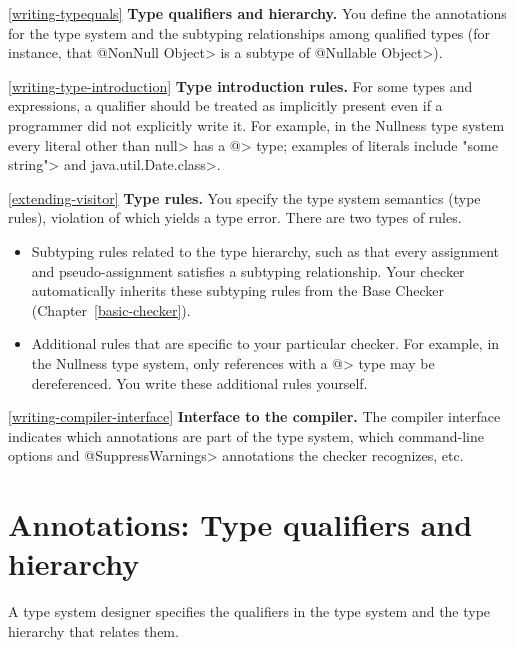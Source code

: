 \begin{description}

\item{\ref{writing-typequals}}
  \textbf{Type qualifiers and hierarchy.}  You define the annotations for
  the type system and the subtyping relationships among qualified types
  (for instance, that \<@NonNull Object> is a subtype of \<@Nullable
  Object>).

\item{\ref{writing-type-introduction}}
  \textbf{Type introduction rules.}  For some types and
  expressions, a qualifier should be treated as implicitly present even if a
  programmer did not explicitly write it.  For example, in the Nullness
  type system every literal
  other than \<null> has a \<@> type;
  examples of literals include \<"some string"> and \<java.util.Date.class>.

\item{\ref{extending-visitor}}
  \textbf{Type rules.}  You specify the type system semantics (type
  rules), violation of which yields a type error.  There are two types of
  rules.
\begin{itemize}
\item
  Subtyping rules related to the type hierarchy, such as that every
  assignment and pseudo-assignment satisfies a subtyping relationship.
  Your checker automatically inherits these subtyping rules from the Base
  Checker (Chapter~\ref{basic-checker}).
\item
  Additional rules that are specific to your particular checker.  For
  example, in the Nullness type system, only references with a
  \<@> type may be dereferenced.  You
  write these additional rules yourself.
\end{itemize}

\item{\ref{writing-compiler-interface}}
  \textbf{Interface to the compiler.}  The compiler interface indicates
  which annotations are part of the type system, which command-line options
  and \<@SuppressWarnings> annotations the checker recognizes, etc.
\end{description}


\section{Annotations: Type qualifiers and hierarchy\label{writing-typequals}}

A type system designer specifies the qualifiers in the type system and
the type hierarchy that relates them.

